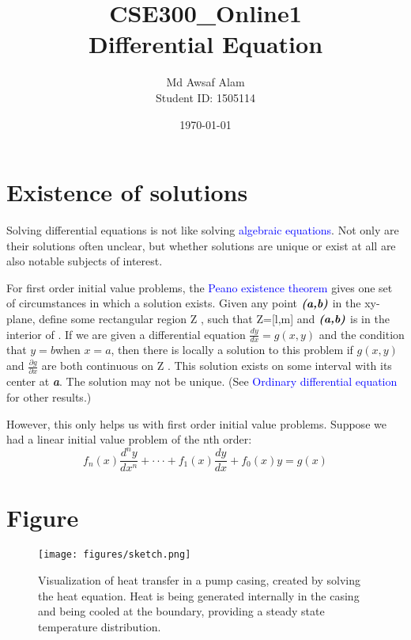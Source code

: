 \documentclass{article}
\title{CSE300\_Online1\\Differential Equation}
\author{Md Awsaf Alam\\Student ID: 1505114}
\date{\today}
\begin{document}
\maketitle

\newpage

\section{Existence of solutions}
Solving differential equations is not like solving \textcolor{blue}{algebraic equations}. Not only are their solutions often unclear, but whether solutions are unique or exist at all are also notable subjects of interest.

\par For first order initial value problems, the \textcolor{blue}{Peano existence theorem} gives one set of circumstances in which a solution exists. Given any point $\textbf{\textit{(a,b)}} $ in the xy-plane, define some rectangular region {\displaystyle Z} , such that {\displaystyle Z=[l,m]\times [n,p]} and  $\textbf{\textit{(a,b)}} $ is in the interior of . If we are given a differential equation $\frac {dy}{dx} = g(x,y) $ and the condition that $ y=b $when $x=a$, then there is locally a solution to this problem if $ g(x,y)$ and $\frac {\partial g}{\partial x}$ are both continuous on {\displaystyle Z} . This solution exists on some interval with its center at  \textbf{\textit{a}}. The solution may not be unique. (See \textcolor{blue}{Ordinary differential equation} for other results.)

\par However, this only helps us with first order initial value problems. Suppose we had a linear initial value problem of the nth order:
\begin{equation}
    f_n(x) \frac{d^n y}{dx^n} + \cdot \cdot \cdot+f_1(x)\frac{dy}{dx} + f_0(x)y = g(x)
\end{equation}

\section{Figure}
\begin{figure}[h!]
    \centering
    \texttt{[image: figures/sketch.png]}
    \caption{Visualization of heat transfer in a pump casing, created by solving the heat equation. Heat is being generated internally in the casing and being cooled at the boundary, providing a steady state temperature distribution.}
    \label{fig:bl}
\end{figure}
\end{document}
